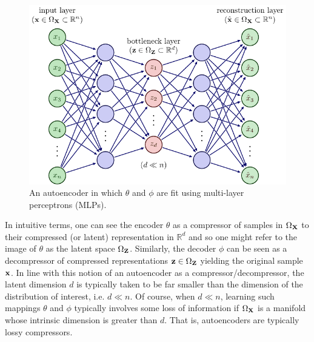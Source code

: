 \documentclass[11pt]{article}
\begin{document}
\begin{figure}[t]
    \centering
    \includegraphics{./figures/neural_nets/AE_autoencoder.pdf}
    \caption{An autoencoder in which $\theta$ and $\phi$ are fit using multi-layer perceptrons (MLPs).}
    \label{fig:autoencoder}
\end{figure}

In intuitive terms, one can see the encoder $\theta$ as a compressor of samples in $\Omega_{\mathbf{X}}$ to their compressed (or latent) representation in $\mathbb{R}^d$ and so one might refer to the image of $\theta$ as the latent space $\Omega_{\mathbf{Z}}$. Similarly, the decoder $\phi$ can be seen as a decompressor of compressed representations $\mathbf{z}\in\Omega_{\mathbf{Z}}$ yielding the original sample $\mathbf{x}$. In line with this notion of an autoencoder as a compressor/decompressor, the latent dimension $d$ is typically taken to be far smaller than the dimension of the distribution of interest, i.e. $d\ll n$. Of course, when $d\ll n$, learning such mappings $\theta$ and $\phi$ typically involves some loss of information if $\Omega_{\mathbf{X}}$ is a manifold whose intrinsic dimension is greater than $d$. That is, autoencoders are typically lossy compressors.
\end{document}

